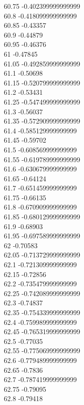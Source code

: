 {60.75	-0.402399999999999\\
60.8	-0.418099999999999\\
60.85	-0.43357\\
60.9	-0.44879\\
60.95	-0.46376\\
61	-0.47845\\
61.05	-0.492859999999999\\
61.1	-0.50698\\
61.15	-0.520799999999999\\
61.2	-0.53431\\
61.25	-0.547499999999999\\
61.3	-0.56037\\
61.35	-0.572909999999999\\
61.4	-0.585129999999999\\
61.45	-0.59702\\
61.5	-0.608569999999999\\
61.55	-0.619789999999999\\
61.6	-0.630679999999999\\
61.65	-0.64124\\
61.7	-0.651459999999999\\
61.75	-0.66135\\
61.8	-0.670909999999999\\
61.85	-0.680129999999999\\
61.9	-0.68903\\
61.95	-0.697589999999999\\
62	-0.70583\\
62.05	-0.713729999999999\\
62.1	-0.721309999999999\\
62.15	-0.72856\\
62.2	-0.735479999999999\\
62.25	-0.742089999999999\\
62.3	-0.74837\\
62.35	-0.754339999999999\\
62.4	-0.759989999999999\\
62.45	-0.765319999999999\\
62.5	-0.77035\\
62.55	-0.775069999999999\\
62.6	-0.779489999999999\\
62.65	-0.7836\\
62.7	-0.787419999999999\\
62.75	-0.79095\\
62.8	-0.79418\\
}
